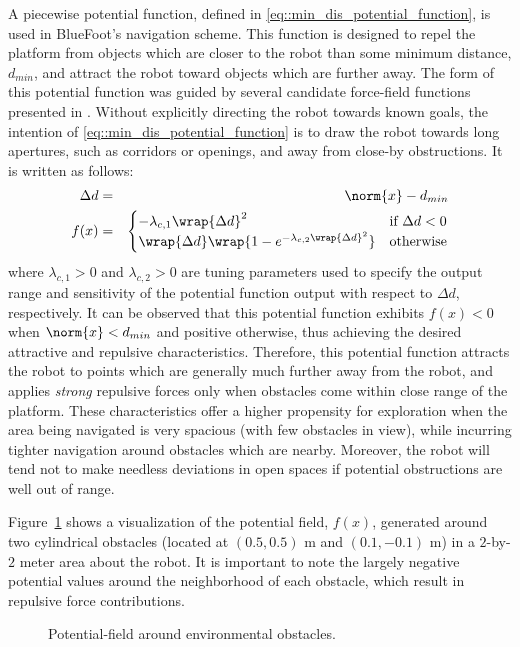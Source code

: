 			A piecewise potential function, defined in \ref{eq::min_dis_potential_function}, is used in BlueFoot's navigation scheme. This function is designed to repel the platform from objects which are closer to the robot than some minimum distance, $d_{min}$, and attract the robot toward objects which are further away. The form of this potential function was guided by several candidate force-field functions presented in \cite{ArambulaCosio2004}. Without explicitly directing the robot towards known goals, the intention of \ref{eq::min_dis_potential_function} is to draw the robot towards long apertures, such as corridors or openings, and away from close-by obstructions. It is written as follows:
				\begin{eqnarray}
					\Delta d &=& \norm{x}-d_{min} \nonumber \\
					f(x) &=& 
					\begin{cases}	
					 	 -\lambda_{c,1} \wrap{\Delta d}^{2} &  \text{if } \Delta d < 0 \\
						\wrap{\Delta d} \wrap{ 1  - e^{ -  \lambda_{c,2} { \wrap{\Delta d} }^{2} } } 	&  \text{otherwise}
					\end{cases}
				\label{eq::min_dis_potential_function}
				\end{eqnarray}
			where $\lambda_{c,1}>0$ and $\lambda_{c,2}>0$ are tuning parameters used to specify the output range and sensitivity of the potential function output with respect to $\Delta d$, respectively. It can be observed that this potential function exhibits $f(x)<0$ when $\norm{x} < d_{min}$ and positive otherwise, thus achieving the desired attractive and repulsive characteristics. Therefore, this potential function attracts the robot to points which are generally much further away from the robot, and applies \emph{strong} repulsive forces only when obstacles come within close range of the platform. These characteristics offer a higher propensity for exploration when the area being navigated is very spacious (with few obstacles in view), while incurring tighter navigation around obstacles which are nearby. Moreover, the robot will tend not to make needless deviations in open spaces if potential obstructions are well out of range.

			Figure~\ref{fig::potential_field} shows a visualization of the potential field, $f(x)$, generated around two cylindrical obstacles (located at $(0.5,0.5)\text{ m}$ and $(0.1,-0.1)\text{ m}$) in a $2$-by-$2$ meter area about the robot. It is important to note the largely negative potential values around the neighborhood of each obstacle, which result in repulsive force contributions.
				\begin{figure}[t!]
					\centering
					\caption{Potential-field around environmental obstacles.}
					\label{fig::potential_field}
				\end{figure}

